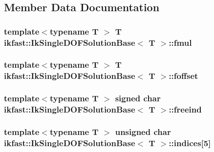 \subsection{Member Data Documentation}
\hypertarget{classikfast_1_1IkSingleDOFSolutionBase_adb64a33a2ce7357684c9c89d75cacd0c}{
\subsubsection[{fmul}]{\setlength{\rightskip}{0pt plus 5cm}template$<$typename T $>$ T {\bf ikfast\-::\-Ik\-Single\-D\-O\-F\-Solution\-Base}$<$ T $>$\-::fmul}}\label{classikfast_1_1IkSingleDOFSolutionBase_adb64a33a2ce7357684c9c89d75cacd0c}
\hypertarget{classikfast_1_1IkSingleDOFSolutionBase_a1d5900ae9cb2d55c396b995b976fdcef}{
\subsubsection[{foffset}]{\setlength{\rightskip}{0pt plus 5cm}template$<$typename T $>$ T {\bf ikfast\-::\-Ik\-Single\-D\-O\-F\-Solution\-Base}$<$ T $>$\-::foffset}}\label{classikfast_1_1IkSingleDOFSolutionBase_a1d5900ae9cb2d55c396b995b976fdcef}
\hypertarget{classikfast_1_1IkSingleDOFSolutionBase_adca245b0afa4133dddbd10803053bc2a}{
\subsubsection[{freeind}]{\setlength{\rightskip}{0pt plus 5cm}template$<$typename T $>$ signed char {\bf ikfast\-::\-Ik\-Single\-D\-O\-F\-Solution\-Base}$<$ T $>$\-::freeind}}\label{classikfast_1_1IkSingleDOFSolutionBase_adca245b0afa4133dddbd10803053bc2a}
\hypertarget{classikfast_1_1IkSingleDOFSolutionBase_a50d8439b7f735a474f6dfe42e91de455}{
\subsubsection[{indices}]{\setlength{\rightskip}{0pt plus 5cm}template$<$typename T $>$ unsigned char {\bf ikfast\-::\-Ik\-Single\-D\-O\-F\-Solution\-Base}$<$ T $>$\-::indices\mbox{[}5\mbox{]}}}\label{classikfast_1_1IkSingleDOFSolutionBase_a50d8439b7f735a474f6dfe42e91de455}

